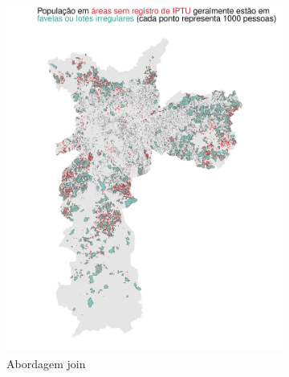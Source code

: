 \begin{figure}[h]
    \caption{Inconsistências entre dados do IPTU e do censo}
    \begin{subfigure}[t]{0.45\linewidth}
        \centering
        \includegraphics[width = \linewidth]{imagens/mapa_pontos.pdf}
        \caption{Abordagem join}
        \label{fig:pontos_erro}
    \end{subfigure}
    \hfill
    \begin{subfigure}[t]{0.45\linewidth}

\end{subfigure}
\end{figure}
